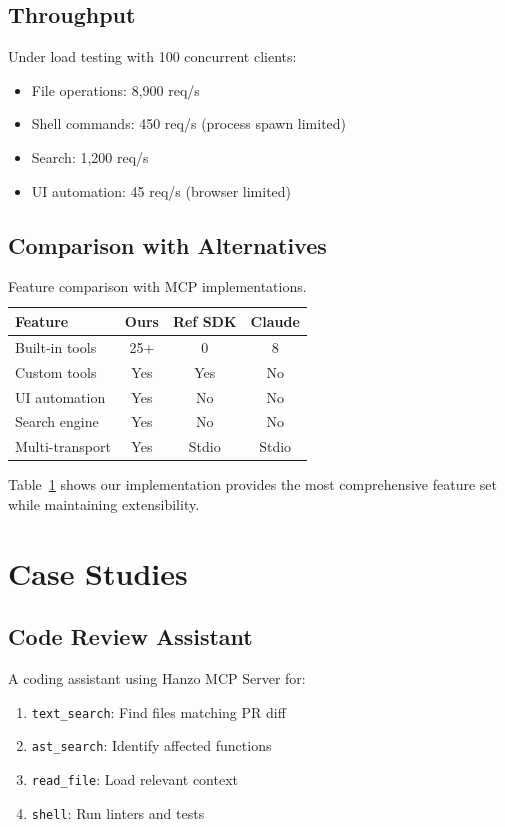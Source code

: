 \documentclass[11pt,twocolumn]{article}
\begin{document}
\subsection{Throughput}

Under load testing with 100 concurrent clients:
\begin{itemize}
    \item File operations: 8,900 req/s
    \item Shell commands: 450 req/s (process spawn limited)
    \item Search: 1,200 req/s
    \item UI automation: 45 req/s (browser limited)
\end{itemize}

\subsection{Comparison with Alternatives}

\begin{table}[h]
\centering
\caption{Feature comparison with MCP implementations.}
\label{tab:compare}
\begin{tabular}{lccc}
\toprule
\textbf{Feature} & \textbf{Ours} & \textbf{Ref SDK} & \textbf{Claude} \\
\midrule
Built-in tools & 25+ & 0 & 8 \\
Custom tools & Yes & Yes & No \\
UI automation & Yes & No & No \\
Search engine & Yes & No & No \\
Multi-transport & Yes & Stdio & Stdio \\
\bottomrule
\end{tabular}
\end{table}

Table~\ref{tab:compare} shows our implementation provides the most comprehensive feature set while maintaining extensibility.

\section{Case Studies}

\subsection{Code Review Assistant}

A coding assistant using Hanzo MCP Server for:
\begin{enumerate}
    \item \texttt{text\_search}: Find files matching PR diff
    \item \texttt{ast\_search}: Identify affected functions
    \item \texttt{read\_file}: Load relevant context
    \item \texttt{shell}: Run linters and tests
\end{enumerate}
\end{document}
